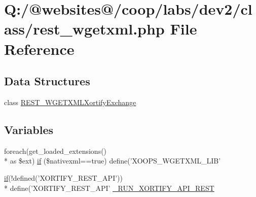 \hypertarget{rest__wgetxml_8php}{\section{Q\-:/@websites@/coop/labs/dev2/class/rest\-\_\-wgetxml.php File Reference}
\label{rest__wgetxml_8php}
}
\subsection*{Data Structures}
\begin{DoxyCompactItemize}
\item 
class \hyperlink{class_r_e_s_t___w_g_e_t_x_m_l_xortify_exchange}{R\-E\-S\-T\-\_\-\-W\-G\-E\-T\-X\-M\-L\-Xortify\-Exchange}
\end{DoxyCompactItemize}
\subsection*{Variables}
\begin{DoxyCompactItemize}
\item 
foreach(get\-\_\-loaded\-\_\-extensions() \\*
as \$ext) \hyperlink{rest__wgetxml_8php_adfcda37e07067335b32d169544e107e3}{if} (\$nativexml==true) define('X\-O\-O\-P\-S\-\_\-\-W\-G\-E\-T\-X\-M\-L\-\_\-\-L\-I\-B'
\item 
\hyperlink{index_8php_ae2ccdf355624402b65fc2226f2a661cd}{if}(!defined('X\-O\-R\-T\-I\-F\-Y\-\_\-\-R\-E\-S\-T\-\_\-\-A\-P\-I')) \\*
define('X\-O\-R\-T\-I\-F\-Y\-\_\-\-R\-E\-S\-T\-\_\-\-A\-P\-I' \hyperlink{rest__wgetxml_8php_a731f04083e48e3087b2f5cad38672473}{\-\_\-\-R\-U\-N\-\_\-\-X\-O\-R\-T\-I\-F\-Y\-\_\-\-A\-P\-I\-\_\-\-R\-E\-S\-T}
\end{DoxyCompactItemize}


